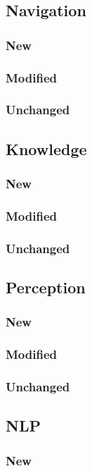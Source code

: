 \documentclass[main.tex]{subfiles}
\begin{document}
                \subsection{Navigation}
                \subsubsection{New}
                \subsubsection{Modified}
                \subsubsection{Unchanged}
                \subsection{Knowledge}
                \subsubsection{New}
                \subsubsection{Modified}
                \subsubsection{Unchanged}
                \subsection{Perception}
                \subsubsection{New}
                \subsubsection{Modified}
                \subsubsection{Unchanged}
                \subsection{NLP}
                \subsubsection{New}
\end{document}
